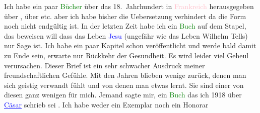            Ich habe ein paar \textcolor{green}{Bücher}{} über das 18. Jahrhundert in \textcolor{pink}{Frankreich}{}\ledrightnote{\textcolor{pink}{Frankreich}} herausgegeben über \label{K_L02422_1v}\label{K_L02422_1h}, über \label{K_L02422_2v}\label{K_L02422_2h} etc. aber ich habe bisher die Uebersetzung verhindert da die
                    Form noch nicht endgültig ist.\pend
           \pstart
           {\pb}In der letzten Zeit habe ich
                    ein \textcolor{green}{Buch}{} auf dem Stapel,
                         das beweisen will dass das Leben \textcolor{blue}{Jesu}{}\ledrightnote{\textcolor{blue}{Jesus}} (ungefähr wie das Leben Wilhelm Tells)
                    nur Sage ist. Ich habe ein paar Kapitel schon veröffentlicht und werde bald
                    damit zu Ende sein, erwarte nur Rückkehr der Gesundheit. Es wird leider viel
                    Geheul verursachen.\pend
           \pstart
           Dieser Brief ist ein sehr schwacher Ausdruck meiner freundschaftlichen Gefühle.
                    Mit den Jahren blieben wenige zurück, denen man sich geistig verwandt fühlt und
                    von denen man etwas lernt. Sie sind einer von diesen ganz wenigen für mich.\pend
           \pstart
           Jemand sagte mir, ein \textcolor{green}{Buch}{}
                    das ich 1918 über \textcolor{blue}{\uline{Cäsar}}{}\ledrightnote{\textcolor{blue}{Gaius Iulius Caesar}} schrieb sei \label{K_L02422_3v}\label{K_L02422_3h}. Ich habe weder ein Exemplar noch ein Honorar
